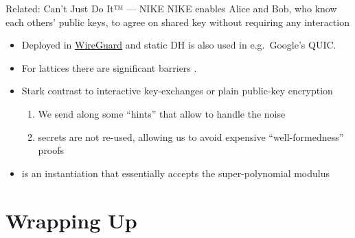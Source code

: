 \documentclass[xcolor=table,10pt,aspectratio=169]{beamer}
\begin{document}
\begin{frame}[label={sec:org8fcd566}]{Related: Can't Just Do It™ — NIKE}
NIKE enables Alice and Bob, who know each others’ public keys, to agree on shared key without requiring any interaction \cite{DifHel76}
\begin{itemize}
\item Deployed in \href{https://www.wireguard.com/}{WireGuard} \cite{EPRINT:HNSWZ20} and static DH is also used in e.g. Google’s QUIC.
\item For lattices there are significant barriers \cite{PKC:GKRS20}.
\item Stark contrast to \alert{interactive} key-exchanges or plain public-key encryption
\begin{enumerate}
\item We send along some “hints” that allow to handle the noise
\item secrets are not re-used, allowing us to avoid expensive “well-formedness” proofs
\end{enumerate}
\item \cite{USENIX:GKQMS24} is an instantiation that essentially accepts the super-polynomial modulus
\end{itemize}
\end{frame}
\section{Wrapping Up}
\label{sec:org9559df9}
\end{document}
